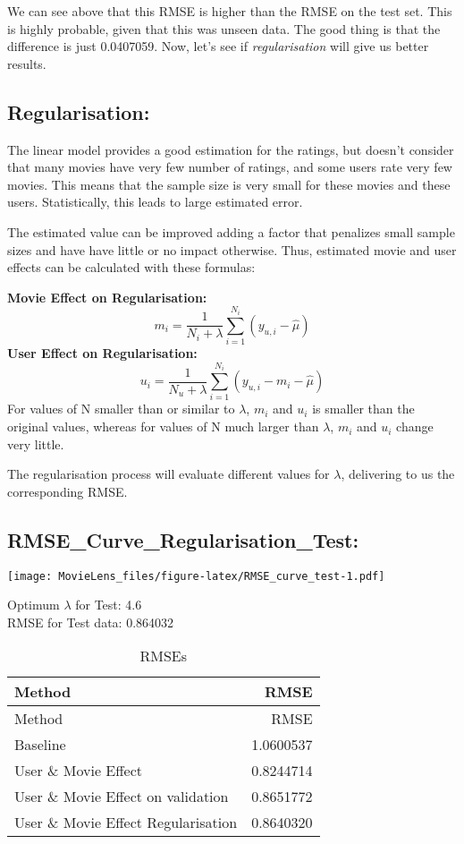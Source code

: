 \documentclass[
]{article}
\begin{document}
We can see above that this RMSE is higher than the RMSE on the test set.
This is highly probable, given that this was unseen data. The good thing
is that the difference is just 0.0407059. Now, let's see if
\emph{regularisation} will give us better results. \newpage

\hypertarget{regularisation}{%
\subsection{\texorpdfstring{\textbf{Regularisation:}}{Regularisation:}}\label{regularisation}}

The linear model provides a good estimation for the ratings, but doesn't
consider that many movies have very few number of ratings, and some
users rate very few movies. This means that the sample size is very
small for these movies and these users. Statistically, this leads to
large estimated error.

The estimated value can be improved adding a factor that penalizes small
sample sizes and have have little or no impact otherwise. Thus,
estimated movie and user effects can be calculated with these formulas:

\textbf{Movie Effect on Regularisation:}
\[m_i=\frac{1}{N_i+\lambda}\sum_{i=1}^{N_i}(y_{u,i}-\hat{\mu})\]
\textbf{User Effect on Regularisation:}
\[u_i=\frac{1}{N_u+\lambda}\sum_{i=1}^{N_i}(y_{u,i}-m_i-\hat{\mu})\] For
values of N smaller than or similar to \(\lambda\), \(m_i\) and \(u_i\)
is smaller than the original values, whereas for values of N much larger
than \(\lambda\), \(m_i\) and \(u_i\) change very little.

The regularisation process will evaluate different values for
\(\lambda\), delivering to us the corresponding RMSE.

\hypertarget{rmse_curve_regularisation_test}{%
\subsection{\texorpdfstring{\textbf{RMSE\_Curve\_Regularisation\_Test:}}{RMSE\_Curve\_Regularisation\_Test:}}\label{rmse_curve_regularisation_test}}

\texttt{[image: MovieLens\_files/figure-latex/RMSE\_curve\_test-1.pdf]}

Optimum \(\lambda\) for Test: 4.6\\
RMSE for Test data: 0.864032 \newpage

\begin{longtable}[]{@{}lr@{}}
\caption{RMSEs}\tabularnewline
\toprule
Method & RMSE\tabularnewline
\midrule
\endfirsthead
\toprule
Method & RMSE\tabularnewline
\midrule
\endhead
Baseline & 1.0600537\tabularnewline
User \& Movie Effect & 0.8244714\tabularnewline
User \& Movie Effect on validation & 0.8651772\tabularnewline
User \& Movie Effect Regularisation & 0.8640320\tabularnewline
\bottomrule
\end{longtable}
\end{document}
